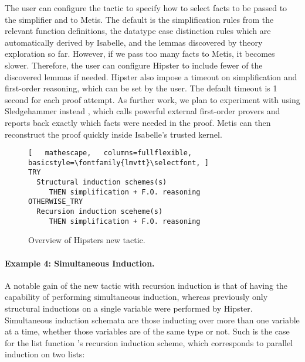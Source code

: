 The user can configure the tactic to specify how to select facts to be passed to the simplifier and to Metis.
%
The default is the simplification rules from the relevant function definitions, the datatype case distinction rules which are automatically derived by Isabelle, and the lemmas discovered by theory exploration so far.
%
%
However, if we pass too many facts to Metis, it becomes slower. Therefore, the user can configure Hipster to include fewer of the discovered lemmas if needed. Hipster also impose a timeout on simplification and first-order reasoning, which can be set by the user. The default timeout is 1 second for each proof attempt.
%
As further work, we plan to experiment with using Sledgehammer instead \cite{sledgehammer}, which calls powerful external first-order provers and reports back exactly which facts were needed in the proof.
%
Metis can then reconstruct the proof quickly inside Isabelle's trusted kernel.

\begin{figure}
\begin{lstlisting}[   mathescape,   columns=fullflexible,   basicstyle=\fontfamily{lmvtt}\selectfont, ]
TRY
  Structural induction schemes(s)
     THEN simplification + F.O. reasoning
OTHERWISE_TRY
  Recursion induction sceheme(s)
     THEN simplification + F.O. reasoning
\end{lstlisting}		
\caption{Overview of Hipsters new tactic.}	
\label{fig:tactic}
\end{figure}


\paragraph*{Example 4: Simultaneous Induction.}
%

A notable gain of the new tactic with recursion induction is that of having the capability of performing simultaneous induction, whereas previously only structural inductions on a single variable were performed by Hipster.
%
Simultaneous induction schemata are those inducting over more than one variable at a time, whether those variables are of the same type or not.
%
Such is the case for the list function 's recursion induction scheme, which corresponds to parallel induction on two lists:

